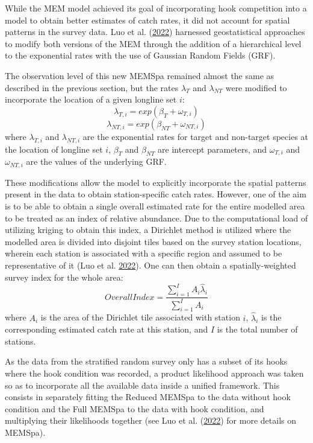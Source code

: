 \documentclass[12pt]{article}\usepackage[]{graphicx}\usepackage[]{color}
\begin{document}
While the MEM model achieved its goal of incorporating hook competition into a model to obtain better estimates of catch rates, it did not account for spatial patterns in the survey data. Luo et al. (\protect\hyperlink{ref-Luo2022}{2022}) harnessed geostatistical approaches to modify both versions of the MEM through the addition of a hierarchical level to the exponential rates with the use of Gaussian Random Fields (GRF).

The observation level of this new MEMSpa remained almost the same as described in the previous section, but the rates \(\lambda_T\) and \(\lambda_{NT}\) were modified to incorporate the location of a given longline set \(i\):
\begin{equation}
\lambda_{T,i} = exp(\beta_T+\omega_{T,i})
\end{equation} \begin{equation}
\lambda_{NT,i} = exp(\beta_{NT}+\omega_{NT,i})
\end{equation}
where \(\lambda_{T,i}\) and \(\lambda_{NT,i}\) are the exponential rates for target and non-target species at the location of longline set \(i\), \(\beta_T\) and \(\beta_{NT}\) are intercept parameters, and \(\omega_{T,i}\) and \(\omega_{NT,i}\) are the values of the underlying GRF.

These modifications allow the model to explicitly incorporate the spatial patterns present in the data to obtain station-specific catch rates. However, one of the aim is to be able to obtain a single overall estimated rate for the entire modelled area to be treated as an index of relative abundance. Due to the computational load of utilizing kriging to obtain this index, a Dirichlet method is utilized where the modelled area is divided into disjoint tiles based on the survey station locations, wherein each station is associated with a specific region and assumed to be representative of it (Luo et al. \protect\hyperlink{ref-Luo2022}{2022}). One can then obtain a spatially-weighted survey index for the whole area:
\begin{equation}
Overall Index = \frac{\sum_{i=1}^I A_i \hat{\lambda}_i}{\sum_{i=1}^I A_i}
\end{equation}
where \(A_i\) is the area of the Dirichlet tile associated with station \(i\), \(\hat{\lambda}_i\) is the corresponding estimated catch rate at this station, and \(I\) is the total number of stations.

As the data from the stratified random survey only has a subset of its hooks where the hook condition was recorded, a product likelihood approach was taken so as to incorporate all the available data inside a unified framework. This consists in separately fitting the Reduced MEMSpa to the data without hook condition and the Full MEMSpa to the data with hook condition, and multiplying their likelihoods together (see Luo et al. (\protect\hyperlink{ref-Luo2022}{2022}) for more details on MEMSpa).
\end{document}
